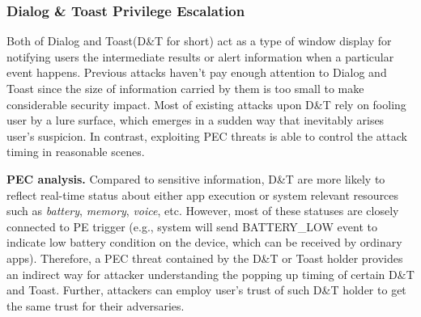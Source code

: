 \subsubsection{Dialog \& Toast Privilege Escalation}


Both of Dialog and Toast(D\&T for short) act as a type of window display for notifying users the intermediate results or alert information when a particular event happens. Previous attacks haven't pay enough attention to Dialog and Toast since the size of information carried by them is too small to make considerable security impact. Most of existing attacks upon D\&T rely on fooling user by a lure surface, which emerges in a sudden way that inevitably arises user's suspicion. In contrast, exploiting PEC threats is able to control the attack timing in reasonable scenes.

\textbf{PEC analysis.} %
Compared to sensitive information, D\&T are more likely to reflect real-time status about either app execution or system relevant resources such as \textit{battery}, \textit{memory}, \textit{voice}, etc. However, most of these statuses are closely connected to PE trigger (e.g., system will send BATTERY\_LOW event to indicate low battery condition on the device, which can be received by ordinary apps). Therefore, a PEC threat contained by the D\&T or Toast holder  provides an indirect way for attacker understanding the popping up timing of certain D\&T and Toast. Further, attackers can employ user's trust of such D\&T holder to get the same trust for their adversaries.

